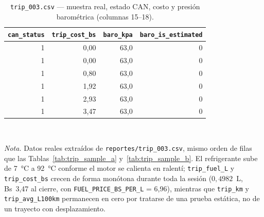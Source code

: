 \begin{table}[H]
	\centering
	\captionsetup{labelformat=simple, labelsep=newline, textfont=it, labelfont=bf, justification=raggedright, singlelinecheck=false}
	\caption{\texttt{trip\_003.csv} — muestra real, estado CAN, costo y presión barométrica (columnas 15--18).}
	\label{tab:trip_sample_c}
	\scriptsize
	\begin{tabular}{rrrr}
		\toprule
		\rowcolor[rgb]{0.851, 0.851, 0.851}
		\texttt{can\_status} & \texttt{trip\_cost\_bs} & \texttt{baro\_kpa} & \texttt{baro\_is\_estimated} \\
		\midrule
		1 & 0,00 & 63,0 & 0 \\
		1 & 0,00 & 63,0 & 0 \\
		1 & 0,80 & 63,0 & 0 \\
		1 & 1,92 & 63,0 & 0 \\
		1 & 2,93 & 63,0 & 0 \\
		1 & 3,47 & 63,0 & 0 \\
		\bottomrule
	\end{tabular}
	\\
	\vspace{2mm}
	\begin{minipage}{\linewidth}
		\small
		\textit{Nota.} Datos reales extraídos de \texttt{reportes/trip\_003.csv}, mismo orden de filas que las Tablas~\ref{tab:trip_sample_a} y~\ref{tab:trip_sample_b}. El refrigerante sube de 7~°C a 92~°C conforme el motor se calienta en ralentí; \texttt{trip\_fuel\_L} y \texttt{trip\_cost\_bs} crecen de forma monótona durante toda la sesión ($0{,}4982$~L, Bs~3{,}47 al cierre, con \texttt{FUEL\_PRICE\_BS\_PER\_L} = 6,96), mientras que \texttt{trip\_km} y \texttt{trip\_avg\_L100km} permanecen en cero por tratarse de una prueba estática, no de un trayecto con desplazamiento.
	\end{minipage}
\end{table}